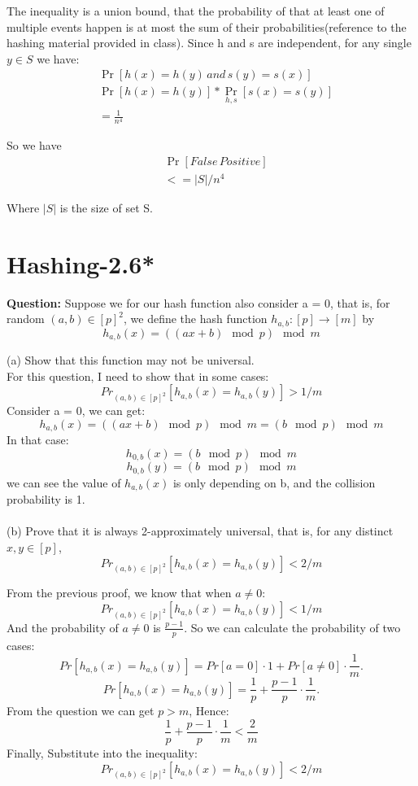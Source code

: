 \documentclass[12pt]{article}
\begin{document}
The inequality is a union bound, that the probability of that at least one of multiple events happen is at most the sum of their probabilities(reference to the hashing material provided in class). Since h and s are independent, for any single $y \in S$ we have:
\begin{equation}
\begin{aligned}
&\mathop{Pr} [h(x)=h(y) \, and \, s(y)=s(x)] \\
&\mathop{Pr} [h(x)=h(y)] * \mathop{Pr} \limits_{h,s} [s(x)=s(y)] \\
&= \frac{1}{n^4}
\end{aligned}
\end{equation}

So we have
\begin{equation}
\begin{aligned}
&\mathop{Pr}  [False \, Positive]\\
&<= |S|/n^4
\end{aligned}
\end{equation}

Where $|S|$ is the size of set S.

\section{Hashing-2.6*}
\textbf{Question:}
Suppose we for our hash function also consider a = 0, that is, for random \((a, b)\in[p]^2\), we define the hash function \(h_{a,b} : [p] \rightarrow [m]\) by
\[h_{a,b}(x) = ((ax + b)\mod{p} )\mod{m}\]

(a) Show that this function may not be universal.\\


For this question, I need to show that in some cases:
\[Pr_{(a,b)\in[p]^2}[h_{a,b}(x) = h_{a,b}(y)] > 1/m\]
Consider a = 0, we can get:
\[h_{a,b}(x) = ((ax + b)\mod{p} )\mod{m} = (b\mod{p} )\mod{m}\]
In that case:
\[h_{0,b}(x) = (b\mod{p} )\mod{m}\]
\[h_{0,b}(y) = (b\mod{p} )\mod{m}\]
we can see the value of \(h_{a,b}(x)\) is only depending on b, and the collision probability is 1.\\
\\
(b) Prove that it is always 2-approximately universal, that is, for any distinct \(x, y \in [p]\), 
\[Pr_{(a,b)\in[p]^2}[h_{a,b}(x) = h_{a,b}(y)] < 2/m\]


From the previous proof, we know that when \(a \neq 0\):
\[Pr_{(a,b)\in[p]^2}[h_{a,b}(x) = h_{a,b}(y)] < 1/m\]
And the probability of \(a \neq 0\) is \(\frac{p-1}{p}\).
So we can calculate the probability of two cases:
\[
Pr[h_{a,b}(x) = h_{a,b}(y)] = Pr[a = 0] \cdot 1 + Pr[a \neq 0] \cdot \frac{1}{m}.
\]
\[
Pr[h_{a,b}(x) = h_{a,b}(y)] = \frac{1}{p} + \frac{p-1}{p} \cdot \frac{1}{m}.
\]
From the question we can get \(p>m\), Hence:
\[\frac{1}{p} + \frac{p-1}{p} \cdot \frac{1}{m}<\frac{2}{m}\]
Finally, Substitute into the inequality:
\[Pr_{(a,b)\in[p]^2}[h_{a,b}(x) = h_{a,b}(y)] < 2/m\]
\end{document}
